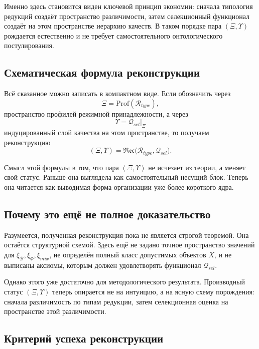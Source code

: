 \documentclass[12pt,a4paper]{article}
\begin{document}
Именно здесь становится виден ключевой принцип экономии: сначала типология редукций создаёт пространство различимости, затем селекционный функционал создаёт на этом пространстве иерархию качеств. В таком порядке пара \((\Xi,\Upsilon)\) рождается естественно и не требует самостоятельного онтологического постулирования.

\subsection{Схематическая формула реконструкции}

Всё сказанное можно записать в компактном виде. Если обозначить через
\begin{equation}
\Xi = \mathrm{Prof}(\mathcal{R}_{type}),
\end{equation}
пространство профилей режимной принадлежности, а через
\begin{equation}
\Upsilon = \mathcal{Q}_{sel}\big|_{\Xi}
\end{equation}
индуцированный слой качества на этом пространстве, то получаем реконструкцию
\begin{equation}
(\Xi,\Upsilon)=\mathfrak{Rec}\bigl(\mathcal{R}_{type},\mathcal{Q}_{sel}\bigr).
\end{equation}

Смысл этой формулы в том, что пара \((\Xi,\Upsilon)\) не исчезает из теории, а меняет свой статус. Раньше она выглядела как самостоятельный несущий блок. Теперь она читается как выводимая форма организации уже более короткого ядра.

\subsection{Почему это ещё не полное доказательство}

Разумеется, полученная реконструкция пока не является строгой теоремой. Она остаётся структурной схемой. Здесь ещё не задано точное пространство значений для \(\xi_{\mathcal{B}},\xi_{\Phi},\xi_{mix}\), не определён полный класс допустимых объектов \(X\), и не выписаны аксиомы, которым должен удовлетворять функционал \(\mathcal{Q}_{sel}\).

Однако этого уже достаточно для методологического результата. Производный статус \((\Xi,\Upsilon)\) теперь опирается не на интуицию, а на ясную схему порождения: сначала различимость по типам редукции, затем селекционная оценка на пространстве этой различимости.

\subsection{Критерий успеха реконструкции}
\end{document}
